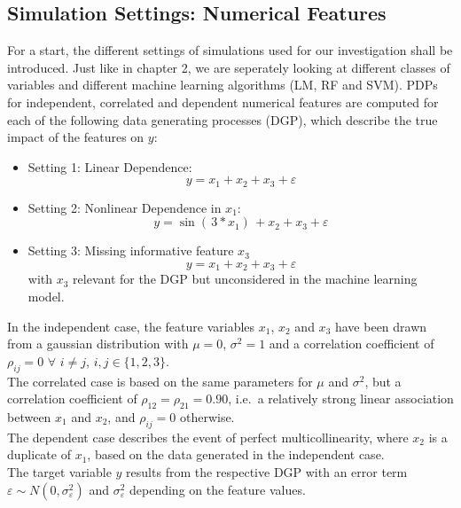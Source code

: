 \documentclass[
]{krantz}
\begin{document}
\hypertarget{simulation-settings-numerical-features}{%
\subsection{Simulation Settings: Numerical Features}\label{simulation-settings-numerical-features}}

For a start, the different settings of simulations used for our investigation shall be introduced. Just like in chapter 2, we are seperately looking at different classes of variables and different machine learning algorithms (LM, RF and SVM). PDPs for independent, correlated and dependent numerical features are computed for each of the following data generating processes (DGP), which describe the true impact of the features on \(y\):

\begin{itemize}
\item
  Setting 1: Linear Dependence:\\
  \begin{equation}
  y = x_1 + x_2 + x_3 + \varepsilon \label{eq:10}
  \end{equation}
\item
  Setting 2: Nonlinear Dependence in \(x_1\):\\
  \begin{equation}
  y = \sin{( \, 3*x_1 ) \,} + x_2 + x_3 + \varepsilon \label{eq:11}
  \end{equation}
\item
  Setting 3: Missing informative feature \(x_3\)\\
  \begin{equation}
  y = x_1 + x_2 + x_3 + \varepsilon \label{eq:12}
  \end{equation} with \(x_3\) relevant for the DGP but unconsidered in the machine learning model.
\end{itemize}

In the independent case, the feature variables \(x_1\), \(x_2\) and \(x_3\) have been drawn from a gaussian distribution with \(\mu = 0\), \(\sigma^2 = 1\) and a correlation coefficient of \(\rho_{ij} = 0\) \(\forall\) \(i \ne j\), \(i,j \in \{1,2,3\}\).\\
The correlated case is based on the same parameters for \(\mu\) and \(\sigma^2\), but a correlation coefficient of \(\rho_{12} = \rho_{21} = 0.90\), i.e.~a relatively strong linear association between \(x_1\) and \(x_2\), and \(\rho_{ij} = 0\) otherwise.\\
The dependent case describes the event of perfect multicollinearity, where \(x_2\) is a duplicate of \(x_1\), based on the data generated in the independent case.\\
The target variable \(y\) results from the respective DGP with an error term \(\varepsilon \sim N(0, \sigma^2_\varepsilon)\) and \(\sigma^2_\varepsilon\) depending on the feature values.
\end{document}
